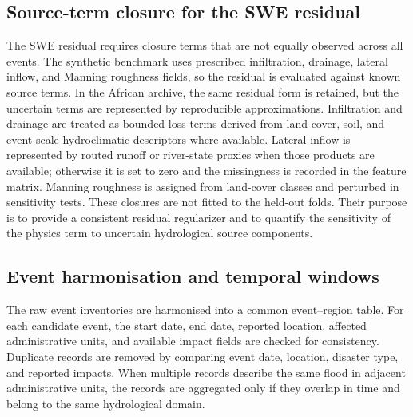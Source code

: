 \documentclass[pdflatex,sn-mathphys-ay]{sn-jnl}
\theoremstyle{thmstyleone}
\begin{document}
\begin{appendices}
\subsection{Source-term closure for the SWE residual}
\label{app:source_term_closure}

The SWE residual requires closure terms that are not equally observed
across all events.  The synthetic benchmark uses prescribed
infiltration, drainage, lateral inflow, and Manning roughness fields,
so the residual is evaluated against known source terms.  In the
African archive, the same residual form is retained, but the uncertain
terms are represented by reproducible approximations.  Infiltration and
drainage are treated as bounded loss terms derived from land-cover,
soil, and event-scale hydroclimatic descriptors where available.
Lateral inflow is represented by routed runoff or river-state proxies
when those products are available; otherwise it is set to zero and the
missingness is recorded in the feature matrix.  Manning roughness is
assigned from land-cover classes and perturbed in sensitivity tests.
These closures are not fitted to the held-out folds.  Their purpose is
to provide a consistent residual regularizer and to quantify the
sensitivity of the physics term to uncertain hydrological source
components.

\subsection{Event harmonisation and temporal windows}
\label{app:event_harmonisation}

The raw event inventories are harmonised into a common event--region
table.  For each candidate event, the start date, end date, reported
location, affected administrative units, and available impact fields
are checked for consistency.  Duplicate records are removed by
comparing event date, location, disaster type, and reported impacts.
When multiple records describe the same flood in adjacent
administrative units, the records are aggregated only if they overlap
in time and belong to the same hydrological domain.


\end{appendices}
\end{document}
